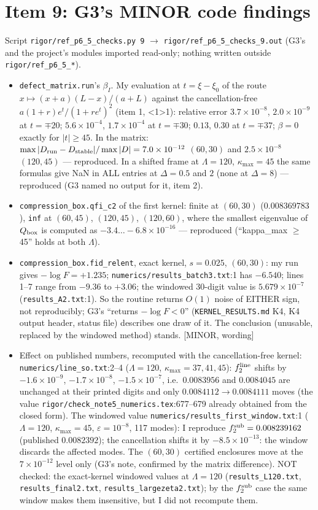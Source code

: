 \documentclass[11pt]{article}
\begin{document}
\section{Item 9: G3's MINOR code findings}
Script \texttt{rigor/ref\_p6\_5\_checks.py 9} $\to$ \texttt{rigor/ref\_p6\_5\_checks\_9.out} (G3's and the project's modules
imported read-only; nothing written outside \texttt{rigor/ref\_p6\_5\_*}).
\begin{itemize}[leftmargin=*]
\item \texttt{defect\_matrix.run}'s $\beta_I$. My evaluation at $t=\xi-\xi_0$ of the route $x\mapsto(x+a)(L-x)/(a+L)$ against
the cancellation-free $a(1+r)e^t/(1+re^t)^2$ (item 1, <1>1): relative error $3.7\times10^{-8}$, $2.0\times10^{-9}$ at
$t=\mp20$; $5.6\times10^{-4}$, $1.7\times10^{-4}$ at $t=\mp30$; $0.13$, $0.30$ at $t=\mp37$; $\beta=0$ exactly for $|t|\ge45$.
In the matrix: $\max|D_{\rm run}-D_{\rm stable}|/\max|D|=7.0\times10^{-12}$ $(60,30)$ and $2.5\times10^{-8}$ $(120,45)$ ---
reproduced. In a shifted frame at $\Lambda=120$, $\kappa_{\max}=45$ the same formulas give NaN in ALL entries at
$\Delta=0.5$ and $2$ (none at $\Delta=8$) --- reproduced (G3 named no output for it, item 2).
\item \texttt{compression\_box.qfi\_c2} of the first kernel: finite at $(60,30)$ ($0.008369783$), \texttt{inf} at $(60,45)$,
$(120,45)$, $(120,60)$, where the smallest eigenvalue of $Q_{\rm box}$ is computed as $-3.4\ldots-6.8\times10^{-16}$ --- reproduced
(``kappa\_max $\ge$ 45'' holds at both $\Lambda$).
\item \texttt{compression\_box.fid\_relent}, exact kernel, $s=0.025$, $(60,30)$: my run gives $-\log F=+1.235$;
\texttt{numerics/results\_batch3.txt}:1 has $-6.540$; lines 1--7 range from $-9.36$ to $+3.06$; the windowed 30-digit value is
$5.679\times10^{-7}$ (\texttt{results\_A2.txt}:1). So the routine returns $O(1)$ noise of EITHER sign, not reproducibly; G3's
``returns $-\log F<0$'' (\texttt{KERNEL\_RESULTS.md} K4, K4 output header, status file) describes one draw of it. The
conclusion (unusable, replaced by the windowed method) stands. [MINOR, wording]
\item Effect on published numbers, recomputed with the cancellation-free kernel: \texttt{numerics/line\_so.txt}:2--4
($\Lambda=120$, $\kappa_{\max}=37,41,45$): $f_2^{\rm line}$ shifts by $-1.6\times10^{-9}$, $-1.7\times10^{-8}$, $-1.5\times10^{-7}$, i.e.\
$0.0083956$ and $0.0084045$ are unchanged at their printed digits and only $0.0084112\to0.0084111$ moves (the value
\texttt{rigor/check\_note5\_numerics.tex}:677--679 already obtained from the closed form). The windowed value
\texttt{numerics/results\_first\_window.txt}:1 ($\Lambda=120$, $\kappa_{\max}=45$, $\varepsilon=10^{-8}$, 117 modes): I reproduce
$f_2^{\rm sub}=0.008239162$ (published $0.0082392$); the cancellation shifts it by $-8.5\times10^{-13}$: the window discards the
affected modes. The $(60,30)$ certified enclosures move at the $7\times10^{-12}$ level only (G3's note, confirmed by the matrix
difference). NOT checked: the exact-kernel windowed values at $\Lambda=120$ (\texttt{results\_L120.txt},
\texttt{results\_final2.txt}, \texttt{results\_largezeta2.txt}); by the $f_2^{\rm sub}$ case the same window makes them insensitive,
but I did not recompute them.
\end{itemize}
\end{document}
